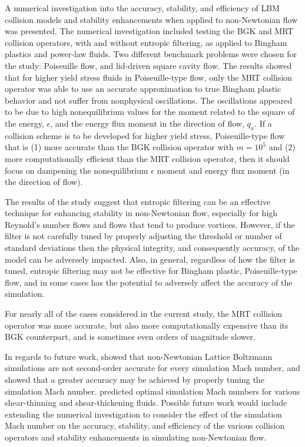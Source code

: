 A numerical investigation into the accuracy, stability, and efficiency of LBM collision models and stability enhancements when applied to non-Newtonian flow was presented.
The numerical investigation included testing the BGK and MRT collision operators, with and without entropic filtering, as applied to Bingham plastics and power-law fluids.
Two different benchmark problems were chosen for the study: Poiseuille flow, and lid-driven square cavity flow.
The results showed that for higher yield stress fluids in Poiseuille-type flow, only the MRT collision operator was able to use an accurate approximation to true Bingham plastic behavior and not suffer from nonphysical oscillations.
The oscillations appeared to be due to high nonequilibrium values for the moment related to the square of the energy, $\epsilon$, and the energy flux moment in the direction of flow, $q_x$.
If a collision scheme is to be developed for higher yield stress, Poiseuille-type flow that is (1) more accurate than the BGK collision operator with $m = 10^5$ and (2) more computationally efficient than the MRT collision operator, then it should focus on dampening the nonequilibrium $\epsilon$ moment and energy flux moment (in the direction of flow).

The results of the study suggest that entropic filtering can be an effective technique for enhancing stability in non-Newtonian flow, especially for high Reynold's number flows and flows that tend to produce vortices.
However, if the filter is not carefully tuned by properly adjusting the threshold or number of standard deviations then the physical integrity, and consequently accuracy, of the model can be adversely impacted.
Also, in general, regardless of how the filter is tuned, entropic filtering may not be effective for Bingham plastic, Poiseuille-type flow, and in some cases has the potential to adversely affect the accuracy of the simulation.

For nearly all of the cases considered in the current study, the MRT collision operator was more accurate, but also more computationally expensive than its BGK counterpart, and is sometimes even orders of magnitude slower.

In regards to future work, \cite{conrad2015accuracy} showed that non-Newtonian Lattice Boltzmann simulations are not second-order accurate for every simulation Mach number, and showed that a greater accuracy may be achieved by properly tuning the simulation Mach number.
\cite{conrad2015accuracy} predicted optimal simulation Mach numbers for various shear-thinning and shear-thickening fluids. 
Possible future work would include extending the numerical investigation to consider the effect of the simulation Mach number on the accuracy, stability, and efficiency of the various collision operators and stability enhancements in simulating non-Newtonian flow.

